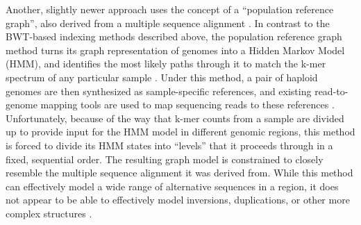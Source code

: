 \documentclass[11pt,proposal]{ucthesis}
\begin{document}
Another, slightly newer approach uses the concept of a ``population reference graph'', also derived from a multiple sequence alignment \cite{dilthey2014improved}. In contrast to the BWT-based indexing methods described above, the population reference graph method turns its graph representation of genomes into a Hidden Markov Model (HMM), and identifies the most likely paths through it to match the k-mer spectrum of any particular sample \cite{dilthey2014improved}. Under this method, a pair of haploid genomes are then synthesized as sample-specific references, and existing read-to-genome mapping tools are used to map sequencing reads to these references \cite{dilthey2014improved}. Unfortunately, because of the way that k-mer counts from a sample are divided up to provide input for the HMM model in different genomic regions, this method is forced to divide its HMM states into ``levels'' that it proceeds through in a fixed, sequential order. The resulting graph model is constrained to closely resemble the multiple sequence alignment it was derived from. While this method can effectively model a wide range of alternative sequences in a region, it does not appear to be able to effectively model inversions, duplications, or other more complex structures \cite{dilthey2014improved}.
    







        
        
        
        
    
    
    
\end{document}
